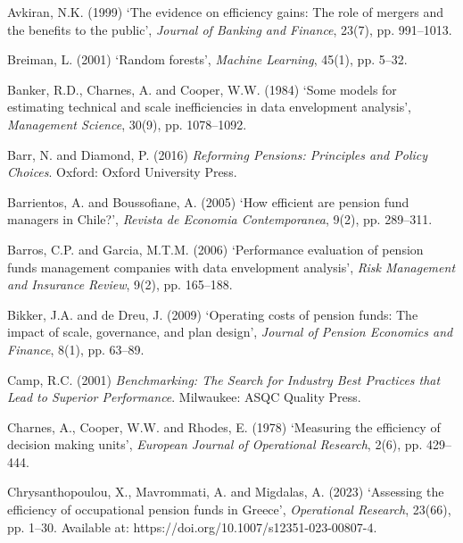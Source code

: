 \documentclass[12pt,a4paper]{article}
\begin{document}
\begin{description}[style=nextline, leftmargin=0pt, labelwidth=0pt, itemsep=0.5em]

\item Avkiran, N.K. (1999) `The evidence on efficiency gains: The role of mergers and the benefits to the public', \textit{Journal of Banking and Finance}, 23(7), pp. 991--1013.

\item Breiman, L. (2001) `Random forests', \textit{Machine Learning}, 45(1), pp. 5--32.

\item Banker, R.D., Charnes, A. and Cooper, W.W. (1984) `Some models for estimating technical and scale inefficiencies in data envelopment analysis', \textit{Management Science}, 30(9), pp. 1078--1092.

\item Barr, N. and Diamond, P. (2016) \textit{Reforming Pensions: Principles and Policy Choices}. Oxford: Oxford University Press.

\item Barrientos, A. and Boussofiane, A. (2005) `How efficient are pension fund managers in Chile?', \textit{Revista de Economia Contemporanea}, 9(2), pp. 289--311.

\item Barros, C.P. and Garcia, M.T.M. (2006) `Performance evaluation of pension funds management companies with data envelopment analysis', \textit{Risk Management and Insurance Review}, 9(2), pp. 165--188.

\item Bikker, J.A. and de Dreu, J. (2009) `Operating costs of pension funds: The impact of scale, governance, and plan design', \textit{Journal of Pension Economics and Finance}, 8(1), pp. 63--89.

\item Camp, R.C. (2001) \textit{Benchmarking: The Search for Industry Best Practices that Lead to Superior Performance}. Milwaukee: ASQC Quality Press.

\item Charnes, A., Cooper, W.W. and Rhodes, E. (1978) `Measuring the efficiency of decision making units', \textit{European Journal of Operational Research}, 2(6), pp. 429--444.

\item Chrysanthopoulou, X., Mavrommati, A. and Migdalas, A. (2023) `Assessing the efficiency of occupational pension funds in Greece', \textit{Operational Research}, 23(66), pp. 1--30. Available at: https://doi.org/10.1007/s12351-023-00807-4.


\end{description}
\end{document}
